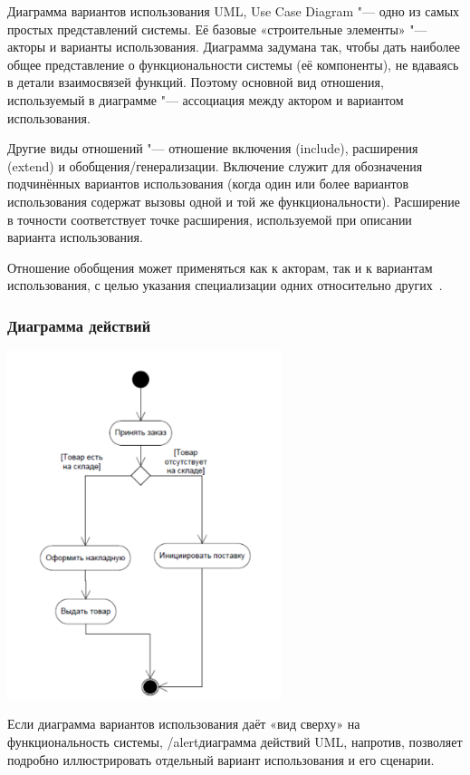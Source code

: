 \documentclass{../industrial-development}
\begin{document}
\lecturenotes

\alert{Диаграмма вариантов использования UML, Use Case Diagram} "--- одно из самых простых представлений системы. Её базовые «строительные элементы» "--- акторы и варианты использования. Диаграмма задумана так, чтобы дать наиболее общее представление о функциональности системы (её компоненты), не вдаваясь в детали взаимосвязей функций. Поэтому основной вид отношения, используемый в диаграмме "--- ассоциация между актором и вариантом использования.

Другие виды отношений "--- отношение включения (include), расширения (extend) и обобщения/генерализации. Включение служит для обозначения подчинённых вариантов использования (когда один или более вариантов использования содержат вызовы одной и той же
функциональности). Расширение в точности соответствует точке расширения, используемой при описании варианта использования.

Отношение обобщения может применяться как к акторам, так и к вариантам использования, с целью указания специализации одних относительно других~\cite[с.~46]{Maglinec}.


\begin{frame} \frametitle {Диаграмма действий}
 \centerline{\includegraphics[width=0.6\textwidth]{pict5.pdf}}
\end{frame}

\lecturenotes

Если диаграмма вариантов использования даёт «вид сверху» на функциональность системы, /alert{диаграмма действий UML}, напротив, позволяет подробно иллюстрировать отдельный вариант использования и его сценарии.
\end{document}
